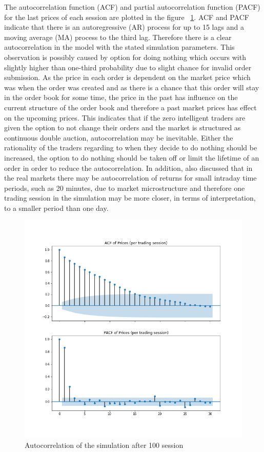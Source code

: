 The autocorrelation function (ACF) and partial autocorrelation function (PACF) for the last prices of
each session are plotted in the figure ~\ref{fig:basic_autocorr}. ACF and PACF indicate that there is 
an autoregressive (AR) process for up to 15 lags and a moving average (MA) process to the third lag. Therefore
there is a clear autocorrelation in the model with the stated simulation parameters. This
observation is possibly caused by option for doing nothing which occurs with slightly higher than
one-third probability due to slight chance for invalid order submission. As the price in each order
is dependent on the market price which was when the order was created and as there is a chance that
this order will stay in the order book for some time, the price in the past has influence on the
current structure of the order book and therefore a past market prices has effect on the upcoming prices.
This indicates that if the zero intelligent traders are given the option to not change their orders and
the market is structured as continuous double auction, autocorrelation may be inevitable. Either the
rationality of the traders regarding to when they decide to do nothing should be increased, the option
to do nothing should be taken off or limit the lifetime of an order in order to reduce the autocorrelation.
In addition, \citet{StylizedFacts01} also discussed that in the real markets there may be autocorrelation 
of returns for small intraday time periods, such as 20 minutes, due to market microstructure and therefore
one trading session in the simulation may be more closer, in terms of interpretation, to a smaller period 
than one day.

\begin{figure}
    \includegraphics[width=\linewidth]{plots/basic_autocorrelation.png}
    \caption{Autocorrelation of the simulation after 100 session}
    \label{fig:basic_autocorr}
\end{figure}


